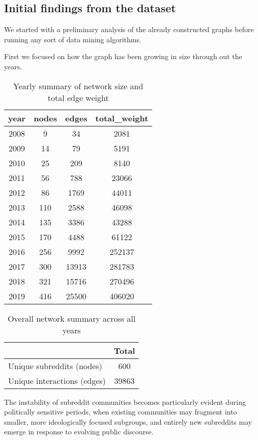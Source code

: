 \documentclass{article}
\theoremstyle{definition}
\begin{document}
\subsection{Initial findings from the dataset}

We started with a preliminary analysis of the already constructed graphs before running any sort of data mining algorithms.

First we focused on how the graph has been growing in size through out the years.

\begin{table}[h]
\centering
\begin{tabular}[]{cccc}
\hline
year & nodes & edges & total\_weight \\
\hline
2008 & 9   & 34    & 2081     \\
2009 & 14  & 79    & 5191     \\
2010 & 25  & 209   & 8140     \\
2011 & 56  & 788   & 23066    \\
2012 & 86  & 1769  & 44011    \\
2013 & 110 & 2588  & 46098    \\
2014 & 135 & 3386  & 43288    \\
2015 & 170 & 4488  & 61122    \\
2016 & 256 & 9992  & 252137   \\
2017 & 300 & 13913 & 281783   \\
2018 & 321 & 15716 & 270496   \\
2019 & 416 & 25500 & 406020   \\
\hline
\end{tabular}
\vspace{10pt}
\caption{Yearly summary of network size and total edge weight}
\end{table}%

\begin{table}[h]
\centering
\begin{tabular}{lc}
\hline
 & Total \\
\hline
Unique subreddits (nodes) & 600 \\
Unique interactions (edges) & 39863 \\
\hline
\end{tabular}
\vspace{10pt}
\caption{Overall network summary across all years}
\end{table}%

The instability of subreddit communities becomes particularly evident during politically sensitive periods, when existing communities may fragment into smaller, more ideologically focused subgroups, and entirely new subreddits may emerge in response to evolving public discourse.
\end{document}
